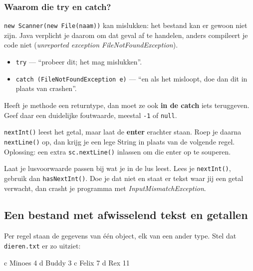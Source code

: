 \documentclass[a4paper,11pt]{article}
\begin{document}
\subsubsection{Waarom die try en catch?}

\texttt{new Scanner(new File(naam))} kan mislukken: het bestand kan er gewoon
niet zijn. Java verplicht je daarom om dat geval af te handelen, anders
compileert je code niet (\textit{unreported exception FileNotFoundException}).

\begin{itemize}
    \item \texttt{try} --- ``probeer dit; het mag mislukken''.
    \item \texttt{catch (FileNotFoundException e)} --- ``en als het misloopt, doe
          dan dit in plaats van crashen''.
\end{itemize}

Heeft je methode een returntype, dan moet ze ook \textbf{in de catch} iets
teruggeven. Geef daar een duidelijke foutwaarde, meestal \texttt{-1} of
\texttt{null}.

\begin{warningbox}
    \texttt{nextInt()} leest het getal, maar laat de \textbf{enter} erachter staan.
    Roep je daarna \texttt{nextLine()} op, dan krijg je een lege String in plaats van
    de volgende regel. Oplossing: een extra \texttt{sc.nextLine()} inlassen om die
    enter op te souperen.
\end{warningbox}

\begin{conceptbox}
    Laat je lusvoorwaarde passen bij wat je in de lus leest. Lees je
    \texttt{nextInt()}, gebruik dan \texttt{hasNextInt()}. Doe je dat niet en staat er
    tekst waar jij een getal verwacht, dan crasht je programma met
    \textit{InputMismatchException}.
\end{conceptbox}

\subsection{Een bestand met afwisselend tekst en getallen}

Per regel staan de gegevens van \'e\'en object, elk van een ander type. Stel dat
\texttt{dieren.txt} er zo uitziet:

\begin{codeblock}{}
    c Minoes 4
    d Buddy 3
    c Felix 7
    d Rex 11
\end{codeblock}
\end{document}

